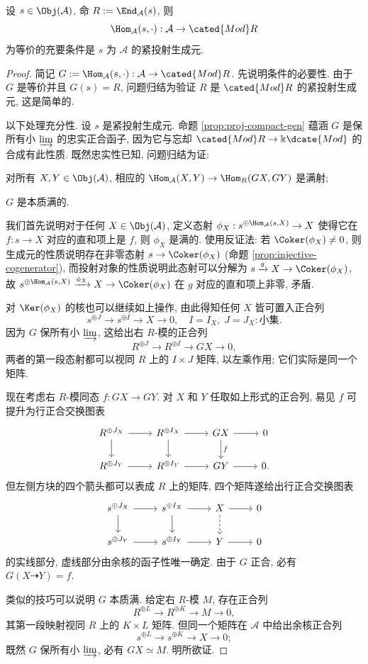\begin{theorem}[P.\ Gabriel]\label{prop:identify-ModR}
	设 $s \in \Obj(\mathcal{A})$, 命 $R := \End_{\mathcal{A}}(s)$, 则
	\[ \Hom_{\mathcal{A}}(s, \cdot): \mathcal{A} \to \cated{Mod}R \]
	为等价的充要条件是 $s$ 为 $\mathcal{A}$ 的紧投射生成元.
\end{theorem}
\begin{proof}
	简记 $G := \Hom_{\mathcal{A}}(s, \cdot): \mathcal{A} \to \cated{Mod}R$. 先说明条件的必要性. 由于 $G$ 是等价并且 $G(s) = R$, 问题归结为验证 $R$ 是 $\cated{Mod}R$ 的紧投射生成元, 这是简单的.
	
	以下处理充分性. 设 $s$ 是紧投射生成元. 命题 \ref{prop:proj-compact-gen} 蕴涵 $G$ 是保所有小 $\varinjlim$ 的忠实正合函子, 因为它与忘却 $\cated{Mod}R \to \Bbbk\dcate{Mod}$ 的合成有此性质. 既然忠实性已知, 问题归结为证:
	\begin{compactitem}
		\item 对所有 $X, Y \in \Obj(\mathcal{A})$, 相应的 $\Hom_{\mathcal{A}}(X, Y) \to \Hom_R(GX, GY)$ 是满射;
		\item $G$ 是本质满的.
	\end{compactitem}
	
	我们首先说明对于任何 $X \in \Obj(\mathcal{A})$, 定义态射 $\phi_X: s^{\oplus \Hom_{\mathcal{A}}(s, X)} \to X$ 使得它在 $f: s \to X$ 对应的直和项上是 $f$, 则 $\phi_X$ 是满的. 使用反证法: 若 $\Coker(\phi_X) \neq 0$, 则生成元的性质说明存在非零态射 $s \to \Coker(\phi_X)$ (命题 \ref{prop:injective-cogenerator}), 而投射对象的性质说明此态射可以分解为 $s \xrightarrow{g} X \to \Coker(\phi_X)$, 故 $s^{\oplus \Hom_{\mathcal{A}}(s, X)} \xrightarrow{\phi_X} X \to \Coker(\phi_X)$ 在 $g$ 对应的直和项上非零, 矛盾.
	
	对 $\Ker(\phi_X)$ 的核也可以继续如上操作, 由此得知任何 $X$ 皆可置入正合列
	\[ s^{\oplus J} \to s^{\oplus I} \to X \to 0, \quad I = I_X, \; J = J_X: \text{小集}. \]
	因为 $G$ 保所有小 $\varinjlim$, 这给出右 $R$-模的正合列
	\[ R^{\oplus J} \to R^{\oplus I} \to GX \to 0, \]
	两者的第一段态射都可以视同 $R$ 上的 $I \times J$ 矩阵, 以左乘作用; 它们实际是同一个矩阵.
	
	现在考虑右 $R$-模同态 $f: GX \to GY$. 对 $X$ 和 $Y$ 任取如上形式的正合列, 易见 $f$ 可提升为行正合交换图表
	\[\begin{tikzcd}
		R^{\oplus J_X} \arrow[r] \arrow[d] & R^{\oplus I_X} \arrow[d] \arrow[r] & GX \arrow[d, "f"] \arrow[r] & 0 \\
		R^{\oplus J_Y} \arrow[r] & R^{\oplus I_Y} \arrow[r] & GY \arrow[r] & 0.
	\end{tikzcd}\]
	但左侧方块的四个箭头都可以表成 $R$ 上的矩阵, 四个矩阵遂给出行正合交换图表
	\[\begin{tikzcd}
		s^{\oplus J_X} \arrow[r] \arrow[d] & s^{\oplus I_X} \arrow[d] \arrow[r] & X \arrow[dashed, d] \arrow[r] & 0 \\
		s^{\oplus J_Y} \arrow[r] & s^{\oplus I_Y} \arrow[r] & Y \arrow[r] & 0
	\end{tikzcd}\]
	的实线部分, 虚线部分由余核的函子性唯一确定. 由于 $G$ 正合, 必有 $G(X \dashrightarrow Y) = f$.
	
	类似的技巧可以说明 $G$ 本质满. 给定右 $R$-模 $M$, 存在正合列
	\[ R^{\oplus L} \to R^{\oplus K} \to M \to 0, \]
	其第一段映射视同 $R$ 上的 $K \times L$ 矩阵. 但同一个矩阵在 $\mathcal{A}$ 中给出余核正合列
	\[ s^{\oplus L} \to s^{\oplus K} \to X \to 0; \]
	既然 $G$ 保所有小 $\varinjlim$, 必有 $GX \simeq M$. 明所欲证.
\end{proof}

